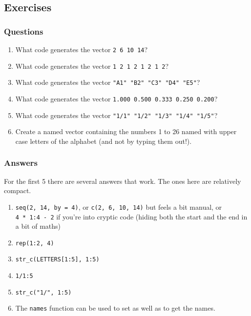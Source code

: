 \documentclass[
]{book}
\providecommand{\tightlist}{%
  \setlength{\itemsep}{0pt}\setlength{\parskip}{0pt}}
\begin{document}
\hypertarget{exercises-2}{%
\subsection{Exercises}\label{exercises-2}}

\hypertarget{questions-5}{%
\subsubsection{Questions}\label{questions-5}}

\begin{enumerate}
\def\labelenumi{\arabic{enumi})}
\tightlist
\item
  What code generates the vector \texttt{2\ 6\ 10\ 14}?
\item
  What code generates the vector \texttt{1\ 2\ 1\ 2\ 1\ 2\ 1\ 2}?
\item
  What code generates the vector \texttt{"A1"\ "B2"\ "C3"\ "D4"\ "E5"}?
\item
  What code generates the vector \texttt{1.000\ 0.500\ 0.333\ 0.250\ 0.200}?
\item
  What code generates the vector \texttt{"1/1"\ "1/2"\ "1/3"\ "1/4"\ "1/5"}?
\item
  Create a named vector containing the numbers 1 to 26 named with upper case letters of the alphabet (and not by typing them out!).
\end{enumerate}

\hypertarget{answers-5}{%
\subsubsection{Answers}\label{answers-5}}

For the first 5 there are several answers that work. The ones here are relatively compact.

\begin{enumerate}
\def\labelenumi{\arabic{enumi})}
\tightlist
\item
  \texttt{seq(2,\ 14,\ by\ =\ 4)}, or \texttt{c(2,\ 6,\ 10,\ 14)} but feels a bit manual, or \texttt{4\ *\ 1:4\ -\ 2} if you're into cryptic code (hiding both the start and the end in a bit of maths)
\item
  \texttt{rep(1:2,\ 4)}
\item
  \texttt{str\_c(LETTERS{[}1:5{]},\ 1:5)}
\item
  \texttt{1/1:5}
\item
  \texttt{str\_c("1/",\ 1:5)}
\item
  The \texttt{names} function can be used to set as well as to get the names.
\end{enumerate}
\end{document}
